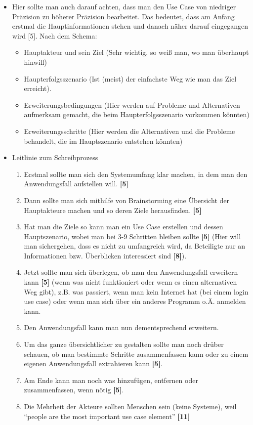 \begin{enumerate}[a)]
\begin{enumerate}[1.]
        \begin{itemize}
            \item Hier sollte man auch darauf achten, dass man den Use Case von niedriger Präzision zu höherer Präzision bearbeitet. Das bedeutet, dass am Anfang erstmal die Hauptinformationen stehen und danach näher darauf eingegangen wird [5]. Nach dem Schema:
            \begin{itemize}
                \item Hauptakteur und sein Ziel (Sehr wichtig, so weiß man, wo man überhaupt hinwill)
                \item Haupterfolgsszenario (Ist (meist) der einfachste Weg wie man das Ziel erreicht).
                \item Erweiterungsbedingungen (Hier werden auf Probleme und Alternativen aufmerksam gemacht, die beim Haupterfolgsszenario vorkommen könnten)
                \item Erweiterungsschritte (Hier werden die Alternativen und die Probleme behandelt, die im Hauptszenario entstehen könnten)
            \end{itemize}
            
            \item Leitlinie zum Schreibprozess
            \begin{enumerate}[1.]
                \item Erstmal sollte man sich den Systemumfang klar machen, in dem man den Anwendungsfall aufstellen will. \textbf{[5]}
                \item Dann sollte man sich mithilfe von Brainstorming eine Übersicht der Hauptakteure machen und so deren Ziele herausfinden. \textbf{[5]}
                \item Hat man die Ziele so kann man ein Use Case erstellen und dessen Hauptszenario, wobei man bei 3-9 Schritten bleiben sollte \textbf{[5]} (Hier will man sichergehen, dass es nicht zu umfangreich wird, da Beteiligte nur an Informationen bzw. Überblicken interessiert sind \textbf{[8]}). 
                \item Jetzt sollte man sich überlegen, ob man den Anwendungsfall erweitern kann \textbf{[5]} (wenn was nicht funktioniert oder wenn es einen alternativen Weg gibt), z.B. was passiert, wenn man kein Internet hat (bei einem login use case) oder wenn man sich über ein anderes Programm o.Ä. anmelden kann.
                \item Den Anwendungsfall kann man nun dementsprechend erweitern.
                \item Um das ganze übersichtlicher zu gestalten sollte man noch drüber schauen, ob man bestimmte Schritte zusammenfassen kann oder zu einem eigenen Anwendungsfall extrahieren kann \textbf{[5]}.
                \item Am Ende kann man noch was hinzufügen, entfernen oder zusammenfassen, wenn nötig \textbf{[5]}.
                \item Die Mehrheit der Akteure sollten Menschen sein (keine Systeme), weil ``people are the most important use case element'' \textbf{[11]}
                

\end{enumerate}
\end{itemize}
\end{enumerate}
\end{enumerate}
